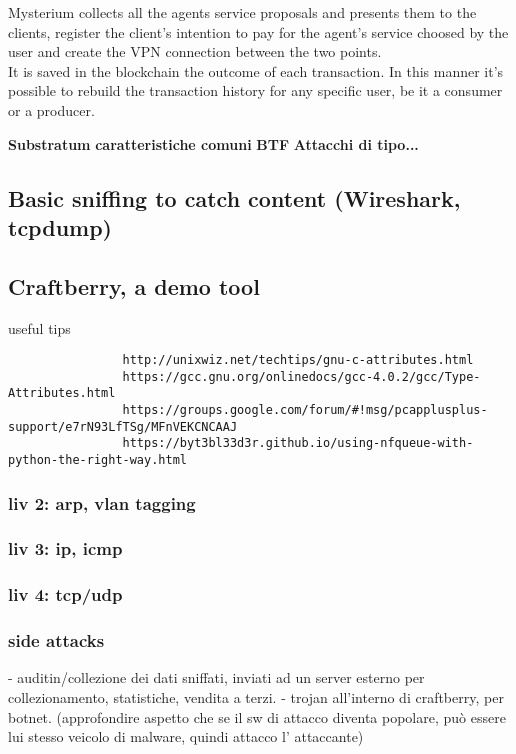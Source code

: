\documentclass[]{article}
\begin{document}
	Mysterium collects all the agents service proposals and presents them to the clients, register the client's intention to pay for the agent's service choosed by the user and create the VPN connection between the two points.\\
	It is saved in the blockchain the outcome of each transaction. In this manner it's possible to rebuild the transaction history for any specific user, be it a consumer or a producer.
	
	\textbf{Substratum}
	\textbf{caratteristiche comuni}
	\textbf{BTF}
	\textbf{Attacchi di tipo...}
	
	\subsection{Basic sniffing to catch content (Wireshark, tcpdump)}
	\subsection{Craftberry, a demo tool}
			useful tips
			\begin{verbatim}
				http://unixwiz.net/techtips/gnu-c-attributes.html
				https://gcc.gnu.org/onlinedocs/gcc-4.0.2/gcc/Type-Attributes.html
				https://groups.google.com/forum/#!msg/pcapplusplus-support/e7rN93LfTSg/MFnVEKCNCAAJ
				https://byt3bl33d3r.github.io/using-nfqueue-with-python-the-right-way.html
			\end{verbatim}
			
			\subsubsection{liv 2: arp, vlan tagging}
			\subsubsection{liv 3: ip, icmp}
			\subsubsection{liv 4: tcp/udp}
			\subsubsection{side attacks}
				- auditin/collezione dei dati sniffati, inviati ad un server esterno per collezionamento, statistiche, vendita a terzi.
				- trojan all'interno di craftberry, per botnet. (approfondire aspetto che se il sw di attacco diventa popolare, può essere lui stesso veicolo di malware, quindi attacco l' attaccante)
			
\end{document}

